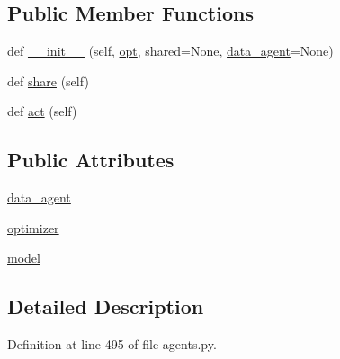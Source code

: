 \subsection*{Public Member Functions}
\begin{DoxyCompactItemize}
\item 
def \hyperlink{classprojects_1_1mastering__the__dungeon_1_1agents_1_1graph__world2_1_1agents_1_1ModelAgentBase_a2904306e4e9d603a78a72e65919fb63c}{\+\_\+\+\_\+init\+\_\+\+\_\+} (self, \hyperlink{classparlai_1_1core_1_1agents_1_1Agent_ab3b45d2754244608c75d4068b90cd051}{opt}, shared=None, \hyperlink{classprojects_1_1mastering__the__dungeon_1_1agents_1_1graph__world2_1_1agents_1_1ModelAgentBase_a229b7901e20dced7e3b3c3e2d381d2ce}{data\+\_\+agent}=None)
\item 
def \hyperlink{classprojects_1_1mastering__the__dungeon_1_1agents_1_1graph__world2_1_1agents_1_1ModelAgentBase_a337693c63ecfac3f01f9e430fb3f8fc9}{share} (self)
\item 
def \hyperlink{classprojects_1_1mastering__the__dungeon_1_1agents_1_1graph__world2_1_1agents_1_1ModelAgentBase_ae233cafdd579db9c82776eb58373145a}{act} (self)
\end{DoxyCompactItemize}
\subsection*{Public Attributes}
\begin{DoxyCompactItemize}
\item 
\hyperlink{classprojects_1_1mastering__the__dungeon_1_1agents_1_1graph__world2_1_1agents_1_1ModelAgentBase_a229b7901e20dced7e3b3c3e2d381d2ce}{data\+\_\+agent}
\item 
\hyperlink{classprojects_1_1mastering__the__dungeon_1_1agents_1_1graph__world2_1_1agents_1_1ModelAgentBase_ade53b46fb7a392e148f69d289c496252}{optimizer}
\item 
\hyperlink{classprojects_1_1mastering__the__dungeon_1_1agents_1_1graph__world2_1_1agents_1_1ModelAgentBase_af5ff64fd5cba16e5446686dba5ce0829}{model}
\end{DoxyCompactItemize}


\subsection{Detailed Description}


Definition at line 495 of file agents.\+py.



